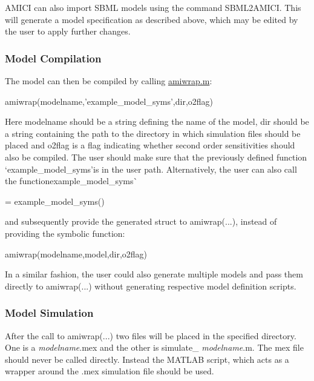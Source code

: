 A\+M\+I\+CI can also import S\+B\+ML models using the command {\ttfamily S\+B\+M\+L2\+A\+M\+I\+CI}. This will generate a model specification as described above, which may be edited by the user to apply further changes.

\subsubsection*{Model Compilation}

The model can then be compiled by calling {\ttfamily \mbox{\hyperlink{amiwrap_8m}{amiwrap.\+m}}}\+: \begin{DoxyVerb}amiwrap(modelname,'example_model_syms',dir,o2flag)
\end{DoxyVerb}


Here {\ttfamily modelname} should be a string defining the name of the model, {\ttfamily dir} should be a string containing the path to the directory in which simulation files should be placed and {\ttfamily o2flag} is a flag indicating whether second order sensitivities should also be compiled. The user should make sure that the previously defined function `\textquotesingle{}example\+\_\+model\+\_\+syms'{\ttfamily is in the user path. Alternatively, the user can also call the function}\textquotesingle{}example\+\_\+model\+\_\+syms\textquotesingle{}\`{} \begin{DoxyVerb}[model] = example_model_syms()
\end{DoxyVerb}


and subsequently provide the generated struct to {\ttfamily amiwrap(...)}, instead of providing the symbolic function\+: \begin{DoxyVerb}amiwrap(modelname,model,dir,o2flag)
\end{DoxyVerb}


In a similar fashion, the user could also generate multiple models and pass them directly to {\ttfamily amiwrap(...)} without generating respective model definition scripts.

\subsubsection*{Model Simulation}

After the call to {\ttfamily amiwrap(...)} two files will be placed in the specified directory. One is a {\itshape modelname}.mex and the other is simulate\+\_\+ {\itshape modelname}.m. The mex file should never be called directly. Instead the M\+A\+T\+L\+AB script, which acts as a wrapper around the .mex simulation file should be used.

